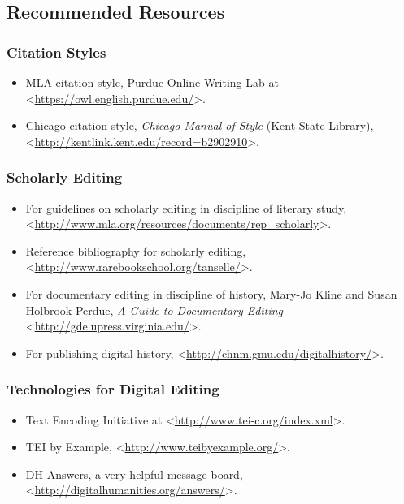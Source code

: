 \documentclass[]{article}
\begin{document}
\subsection{Recommended Resources}\label{recommended-resources}

\subsubsection{Citation Styles}\label{citation-styles}

\begin{itemize}
\itemsep1pt\parskip0pt
\item
  MLA citation style, Purdue Online Writing Lab at
  \textless{}\url{https://owl.english.purdue.edu/}\textgreater{}.
\item
  Chicago citation style, \emph{Chicago Manual of Style} (Kent State
  Library),
  \textless{}\url{http://kentlink.kent.edu/record=b2902910}\textgreater{}.
\end{itemize}

\subsubsection{Scholarly Editing}\label{scholarly-editing}

\begin{itemize}
\itemsep1pt\parskip0pt
\item
  For guidelines on scholarly editing in discipline of literary study,
  \textless{}\url{http://www.mla.org/resources/documents/rep_scholarly}\textgreater{}.
\item
  Reference bibliography for scholarly editing,
  \textless{}\url{http://www.rarebookschool.org/tanselle/}\textgreater{}.
\item
  For documentary editing in discipline of history, Mary-Jo Kline and
  Susan Holbrook Perdue, \emph{A Guide to Documentary Editing}
  \textless{}\url{http://gde.upress.virginia.edu/}\textgreater{}.
\item
  For publishing digital history,
  \textless{}\url{http://chnm.gmu.edu/digitalhistory/}\textgreater{}.
\end{itemize}

\subsubsection{Technologies for Digital
Editing}\label{technologies-for-digital-editing}

\begin{itemize}
\itemsep1pt\parskip0pt
\item
  Text Encoding Initiative at
  \textless{}\url{http://www.tei-c.org/index.xml}\textgreater{}.
\item
  TEI by Example,
  \textless{}\url{http://www.teibyexample.org/}\textgreater{}.
\item
  DH Answers, a very helpful message board,
  \textless{}\url{http://digitalhumanities.org/answers/}\textgreater{}.
\end{itemize}
\end{document}
